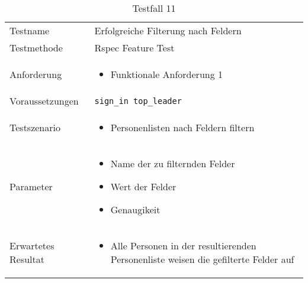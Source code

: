 \begin{table}[h!]
   \begin{tabular}{|L{0.4\textwidth}|L{0.6\textwidth}|}
       \hline
         \\[12pt]
       \hline
        Testname & Erfolgreiche Filterung nach Feldern \\
       \hline
       Testmethode & Rspec Feature Test \\
       \hline
        Anforderung & 
        \begin{itemize}
         \item Funktionale Anforderung 1
         \end{itemize}  \\
       \hline
       Voraussetzungen & \texttt{sign\_in top\_leader} \\
       \hline
       Testszenario & 
       \begin{itemize}
         \item Personenlisten nach Feldern filtern
       \end{itemize} \\
       \hline
       Parameter & 
       \begin{itemize}
         \item Name der zu filternden Felder
         \item Wert der Felder
         \item Genaugikeit
       \end{itemize} \\
       \hline
       Erwartetes Resultat & 
       \begin{itemize}
         \item Alle Personen in der resultierenden Personenliste weisen die gefilterte Felder auf
       \end{itemize} \\
     \hline
     \end{tabular}
     \caption{Testfall 11}
\end{table}

\newpage

